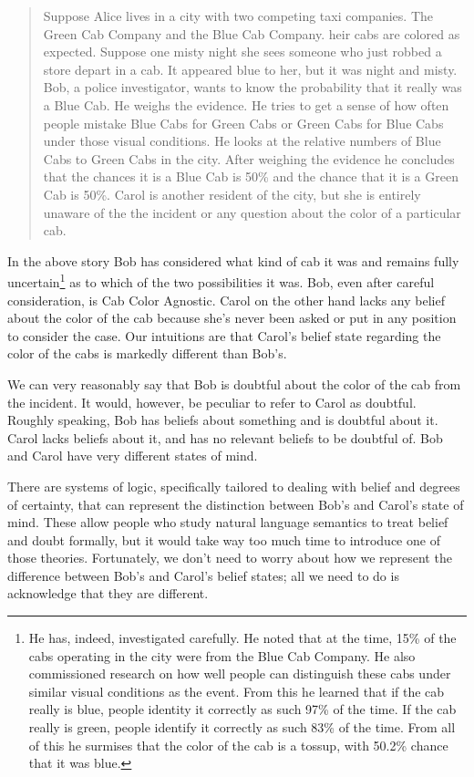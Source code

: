 \documentclass[12pt]{article}
\begin{document}
\begin{quote}
Suppose Alice lives in a city with two competing taxi companies.
The Green Cab Company and the Blue Cab Company. 
heir cabs are colored as expected. Suppose one misty night she sees someone who just robbed a store depart in a cab.
It appeared blue to her, but it was night and misty.
Bob, a police investigator, wants to know the probability that it really was a Blue Cab.
He weighs the evidence. He tries to get a sense of how often people mistake Blue Cabs for Green Cabs or Green Cabs for Blue Cabs under those visual conditions. He looks at the relative numbers of Blue Cabs to Green Cabs in the city.
After weighing the evidence he concludes that the chances it is a Blue Cab is 50\% and the chance that it is a Green Cab is 50\%.
Carol is another resident of the city, but she is entirely unaware of the the incident or any question about the color of a particular cab.
\end{quote}

In the above story Bob has considered what kind of cab it was and remains fully uncertain\footnote{%
    He has, indeed, investigated carefully. He noted that at the time,
    15\% of the cabs operating in the city were from the Blue Cab Company.
    He also commissioned research on how well people can distinguish these cabs under similar visual conditions as the event.
    From this he learned that if the cab really is blue, people identity it correctly as such 97\% of the time.
    If the cab really is green, people identify it correctly as such 83\% of the time.
    From all of this he surmises that the color of the cab is a tossup,
    with 50.2\% chance that it was blue.} as to which of the two possibilities it was.
Bob, even after careful consideration, is Cab Color Agnostic.
Carol on the other hand lacks any belief about the color of the cab because she's never been asked or put in any position to consider the case.
Our intuitions are that Carol's belief state regarding the color of the cabs is markedly different than Bob's. 

We can very reasonably say that Bob is doubtful about the color of the cab from the incident. It would, however, be peculiar to refer to Carol as doubtful. Roughly speaking, Bob has beliefs about something and is doubtful about it. Carol lacks beliefs about it, and has no relevant beliefs to be doubtful of.
Bob and Carol have very different states of mind.

There are systems of logic, specifically tailored to dealing with belief and degrees of certainty, that can represent the distinction between Bob's and Carol's state of mind.
These allow people who study natural language semantics to treat belief and doubt formally, but it would take way too much time to introduce one of those theories.
Fortunately, we don't need to worry about how we represent the difference between Bob's and Carol's belief states;
all we need to do is acknowledge that they are different.
\end{document}
